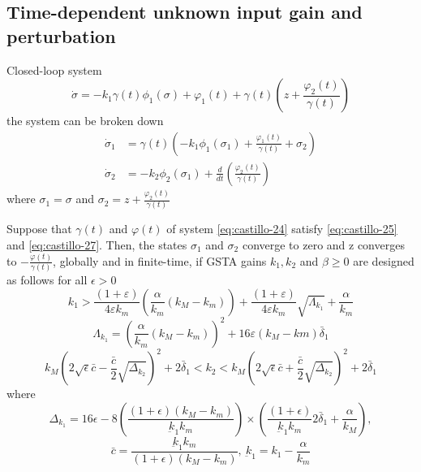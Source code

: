 \subsection{Time-dependent unknown input gain and perturbation}
Closed-loop system
\begin{equation}
    \dot{\sigma} = -k_1\gamma(t)\phi_1(\sigma) + \varphi_1(t) + \gamma(t)\left(z + \frac{\varphi_2(t)}{\gamma(t)}\right)
\end{equation}
the system can be broken down
\begin{equation}
    \begin{split}
    \dot{\sigma}_1 &= \gamma(t)\left(-k_1\phi_1(\sigma_1) + \frac{\varphi_1(t)}{\gamma(t)} + \sigma_2\right)\\
    \dot{\sigma}_2 &= -k_2\phi_2(\sigma_1)+ \frac{d}{dt}\left(\frac{\varphi_2(t)}{\gamma(t)}\right)
    \end{split}
\end{equation}
where $\sigma_1 = \sigma$ and $\sigma_2 = z + \frac{\varphi_2(t)}{\gamma(t)}$

\begin{corollary}
Suppose that $\gamma(t)$ and $\varphi(t)$ of system \eqref{eq:castillo-24} satisfy \eqref{eq:castillo-25} and \eqref{eq:castillo-27}. Then, the states $\sigma_1$ and $\sigma_2$ converge to zero and z converges to $-\frac{\varphi(t)}{\gamma(t)}$, globally and in finite-time, if GSTA gains $k_1, k_2$ and $\beta \geq 0$ are designed as follows for all $\epsilon > 0$
\begin{equation}
    k_1 > \frac{(1+\varepsilon)}{4\varepsilon k_m}\left(\frac{\alpha}{k_m}(k_M - k_m)\right) + \frac{(1+\varepsilon)}{4\varepsilon k_m}\sqrt{\Lambda_{k_1}} + \frac{\alpha}{k_m}
\end{equation}
\begin{equation}
    \Lambda_{k_1} = 
    \left(
    \frac{\alpha}{k_m}(k_M - k_m)
    \right)^2 + 16\varepsilon(k_M - km)\bar{\delta}_1
\end{equation}
\begin{equation}
    k_M \left(2\sqrt{\epsilon}\bar{c}- \frac{\bar{c}}{2}\sqrt{\Delta_{k_2}}\right)^2 + 2\bar{\delta}_1 < k_2 < k_M \left(2\sqrt{\epsilon}\bar{c} + \frac{\bar{c}}{2}\sqrt{\Delta_{k_2}}\right)^2 + 2\bar{\delta}_1 
\end{equation}
where
\begin{equation*}
    \Delta_{k_1} =16\epsilon - 8 \left(\frac{(1+\epsilon)(k_M - k_m)}{\underbar{k}_1 k_m}\right) \times \left(\frac{(1+\epsilon)}{\underbar{k}_1k_m}2\bar{\delta}_1+ \frac{\alpha}{k_M}\right),
\end{equation*}
\begin{equation*}
    \bar{c} = \frac{\underbar{k}_1k_m}{(1+\epsilon)(k_M - k_m)}, \ \underbar{k}_1 = k_1 - \frac{\alpha}{k_m}
\end{equation*}
\end{corollary}

